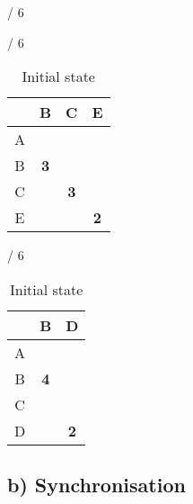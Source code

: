 \documentclass[a4paper, 11 pt, article, accentcolor=tud7b]{tudreport}
\begin{document}
\begin{table}[h]
\begin{subtable}[b]{\textwidth / 6}
	    \caption{$D^{C}$}
	  \end{subtable}
    \hfill
	  \begin{subtable}[b]{\textwidth / 6}
	    \begin{tabular}{| c | c | c | c |}
	    \hline
	      & B & C & E \\ \hline
	    A &   &   &   \\ \hline
	    B & \textbf{3} &   &   \\ \hline
	    C &   & \textbf{3} &   \\ \hline
	    E &   &   & \textbf{2} \\ \hline
	    \end{tabular}
	    \caption{$D^{D}$}
	  \end{subtable}
	  \hfill
	  \begin{subtable}[b]{\textwidth / 6}
	    \begin{tabular}{| c | c | c |}
	    \hline
	      & B & D          \\ \hline
	    A &   &            \\ \hline
	    B & \textbf{4} &   \\ \hline
	    C &   &            \\ \hline
	    D &   & \textbf{2} \\ \hline
	    \end{tabular}
	    \caption{$D^{E}$}
	  \end{subtable}
	  \caption{Initial state}
	\end{table}
	
	\subsection*{b) Synchronisation}
	
\end{document}
